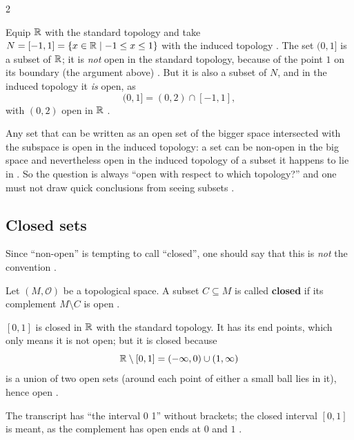 \begin{paracol}{2}
\begin{example}\label{ex:to-interval}
Equip $\mathbb{R}$ with the standard topology and take $N=[-1,1]=\{x\in\mathbb{R}\mid -1\le x\le 1\}$ with the induced topology
. The set $(0,1]$ is a subset of $\mathbb{R}$; it is \emph{not} open in the
standard topology, because of the point $1$ on its boundary (the argument above) . But it is
also a subset of $N$, and in the induced topology it \emph{is} open, as
\[
  (0,1]=(0,2)\cap[-1,1],
\]
with $(0,2)$ open in $\mathbb{R}$ .
\end{example}
Any set that can be written as an open set of the bigger space intersected with the subspace is open in the induced
topology: a set can be non-open in the big space and nevertheless open in the induced topology of a subset it happens
to lie in . So the question is always ``open with respect to which topology?'' and one must not
draw quick conclusions from seeing subsets .

\subsection{Closed sets}

Since ``non-open'' is tempting to call ``closed'', one should say that this is \emph{not} the convention
.
\begin{definition}\label{def:to-closed}
Let $(M,\mathcal O)$ be a topological space. A subset $C\subseteq M$ is called \textbf{closed} if its complement
$M\setminus C$ is open .
\end{definition}
\begin{example}
$[0,1]$ is closed in $\mathbb{R}$ with the standard topology. It has its end points, which only means it is not open; but it is
closed because
\[
  \mathbb{R}\setminus[0,1]=(-\infty,0)\cup(1,\infty)
\]
is a union of two open sets (around each point of either a small ball lies in it), hence open
.
\end{example}
\begin{coursenote}
The transcript has ``the interval 0 1'' without brackets; the closed interval $[0,1]$ is meant, as the complement has
open ends at $0$ and $1$ .
\end{coursenote}


\end{paracol}
